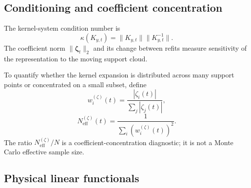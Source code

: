\documentclass[
  11pt,
  letterpaper,
  onehalfspacing,
  normalmargins,
  equalmargins,
  oneside
]{ut-thesis}
\begin{document}
\subsection{Conditioning and coefficient concentration}
\label{subsec:gp-conditioning-coefficients}

The kernel-system condition number is
\begin{equation}
\kappa(K_{y,t})
=
\lVert K_{y,t}\rVert
\lVert K_{y,t}^{-1}\rVert.
\label{eq:gp-kernel-condition-number}
\end{equation}
The coefficient norm \(\lVert\boldsymbol\zeta_t\rVert_2\) and its change
between refits measure sensitivity of the representation to the moving support
cloud.

To quantify whether the kernel expansion is distributed across many support
points or concentrated on a small subset, define
\begin{equation}
 w_i^{(\zeta)}(t)
=
\frac{|\zeta_i(t)|}{\sum_j|\zeta_j(t)|},
\label{eq:gp-coefficient-weights}
\end{equation}
\begin{equation}
N_{\mathrm{eff}}^{(\zeta)}(t)
=
\frac{1}{
\sum_i\left(w_i^{(\zeta)}(t)\right)^2
}.
\label{eq:gp-coefficient-effective-number}
\end{equation}
The ratio
\(N_{\mathrm{eff}}^{(\zeta)}/N\) is a coefficient-concentration diagnostic;
it is not a Monte Carlo effective sample size.


\subsection{Physical linear functionals}
\label{subsec:linear-moment-functionals}
\end{document}
